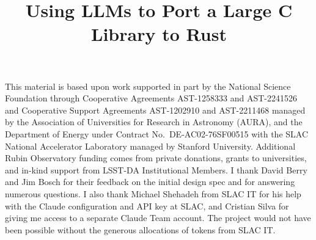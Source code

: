 \documentclass[11pt,twoside]{article}
\begin{document}

\title{Using LLMs to Port a Large C Library to Rust}








\acknowledgments This material is based upon work supported in part by the National Science Foundation through Cooperative Agreements AST-1258333 and AST-2241526 and Cooperative Support Agreements AST-1202910 and AST-2211468 managed by the Association of Universities for Research in Astronomy (AURA), and the Department of Energy under Contract No.\ DE-AC02-76SF00515 with the SLAC National Accelerator Laboratory managed by Stanford University.
Additional Rubin Observatory funding comes from private donations, grants to universities, and in-kind support from LSST-DA Institutional Members.
I thank David Berry and Jim Bosch for their feedback on the initial design spec and for answering numerous questions.
I also thank Michael Shehadeh from SLAC IT for his help with the Claude configuration and API key at SLAC, and Cristian Silva for giving me access to a separate Claude Team account.
The project would not have been possible without the generous allocations of tokens from SLAC IT.


\end{document}

